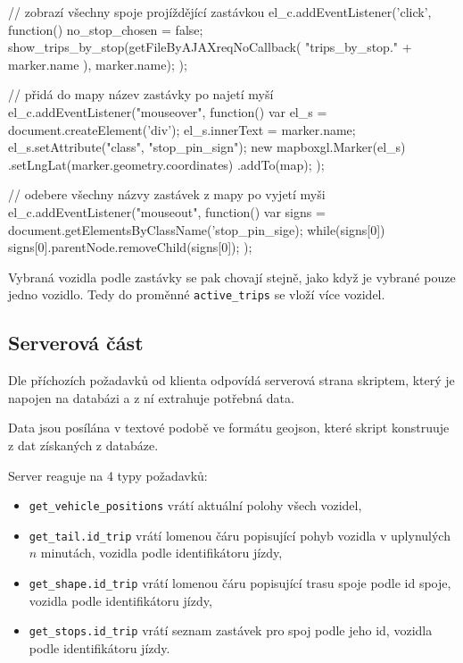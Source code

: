 \begin{code}[frame=none]
// zobrazí všechny spoje projíždějící zastávkou
el_c.addEventListener('click', function() {
  no_stop_chosen = false;
  show_trips_by_stop(getFileByAJAXreqNoCallback(
    "trips_by_stop." + marker.name
  ), marker.name);
});


// přidá do mapy název zastávky po najetí myší
el_c.addEventListener("mouseover", function(){
  var el_s = document.createElement('div');
  el_s.innerText = marker.name;
  el_s.setAttribute("class", "stop_pin_sign");
  new mapboxgl.Marker(el_s)
    .setLngLat(marker.geometry.coordinates)
    .addTo(map);
});


// odebere všechny názvy zastávek z mapy po vyjetí myši
el_c.addEventListener("mouseout", function(){
  var signs = document.getElementsByClassName('stop_pin_sige);
  while(signs[0]) {
    signs[0].parentNode.removeChild(signs[0]);
  }
});
\end{code}


Vybraná vozidla podle zastávky se pak chovají stejně, jako když je vybrané pouze jedno vozidlo. Tedy do proměnné \verb-active_trips- se vloží více vozidel.


\subsection{Serverová část}

Dle příchozích požadavků od klienta odpovídá serverová strana skriptem, který je napojen na databázi a z ní extrahuje potřebná data.


\bigbreak


Data jsou posílána v textové podobě ve formátu \gls{geojson}, které skript konstruuje z dat získaných z databáze.


\bigbreak


Server reaguje na 4 typy požadavků:


\begin{itemize}
	\item \verb-get_vehicle_positions- vrátí aktuální polohy všech vozidel,


	\item \verb-get_tail.id_trip- vrátí lomenou čáru popisující pohyb vozidla v uplynulých $n$ minutách, vozidla podle identifikátoru jízdy,


	\item \verb-get_shape.id_trip- vrátí lomenou čáru popisující trasu spoje podle id spoje, vozidla podle identifikátoru jízdy,


	\item \verb-get_stops.id_trip- vrátí seznam zastávek pro spoj podle jeho id, vozidla podle identifikátoru jízdy.
\end{itemize}


